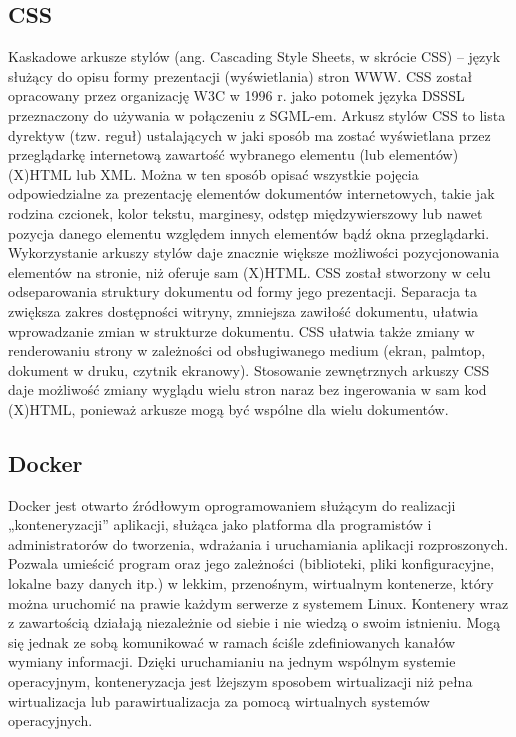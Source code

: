 \documentclass[12pt,a4paper]{article}
\begin{document}
		\subsection{CSS}
			\indent Kaskadowe arkusze stylów (ang. Cascading Style Sheets, w skrócie CSS) – język służący do opisu formy prezentacji (wyświetlania) stron WWW.
				CSS został opracowany przez organizację W3C w 1996 r. jako potomek języka DSSSL przeznaczony do używania w połączeniu z SGML-em. Arkusz stylów CSS to lista
				dyrektyw (tzw. reguł) ustalających w jaki sposób ma zostać wyświetlana przez przeglądarkę internetową zawartość wybranego elementu (lub elementów)
				(X)HTML lub XML. Można w ten sposób opisać wszystkie pojęcia odpowiedzialne za prezentację elementów dokumentów internetowych, takie jak rodzina czcionek,
				kolor tekstu, marginesy, odstęp międzywierszowy lub nawet pozycja danego elementu względem innych elementów bądź okna przeglądarki.
				Wykorzystanie arkuszy stylów daje znacznie większe możliwości pozycjonowania elementów na stronie, niż oferuje sam (X)HTML. CSS został stworzony w celu
				odseparowania struktury dokumentu od formy jego prezentacji. Separacja ta zwiększa zakres dostępności witryny, zmniejsza zawiłość dokumentu, ułatwia wprowadzanie
				zmian w strukturze dokumentu. CSS ułatwia także zmiany w renderowaniu strony w zależności od obsługiwanego medium (ekran, palmtop, dokument w druku, czytnik ekranowy).
				Stosowanie zewnętrznych arkuszy CSS daje możliwość zmiany wyglądu wielu stron naraz bez ingerowania w sam kod (X)HTML, ponieważ arkusze mogą być wspólne dla wielu dokumentów. 		
		
		\subsection{Docker}
			\indent Docker jest otwarto źródłowym oprogramowaniem służącym do realizacji „konteneryzacji” aplikacji, służąca jako platforma dla programistów
				i administratorów do tworzenia, wdrażania i uruchamiania aplikacji rozproszonych. Pozwala umieścić program oraz jego zależności (biblioteki,
				pliki konfiguracyjne, lokalne bazy danych itp.) w lekkim, przenośnym, wirtualnym kontenerze, który można uruchomić na prawie każdym serwerze
				z systemem Linux. Kontenery wraz z zawartością działają niezależnie od siebie i nie wiedzą o swoim istnieniu. Mogą się jednak ze sobą
				komunikować w ramach ściśle zdefiniowanych kanałów wymiany informacji. Dzięki uruchamianiu na jednym wspólnym systemie operacyjnym,
				konteneryzacja jest lżejszym sposobem wirtualizacji niż pełna wirtualizacja lub parawirtualizacja za pomocą wirtualnych systemów
				operacyjnych.
				 	
\end{document}
